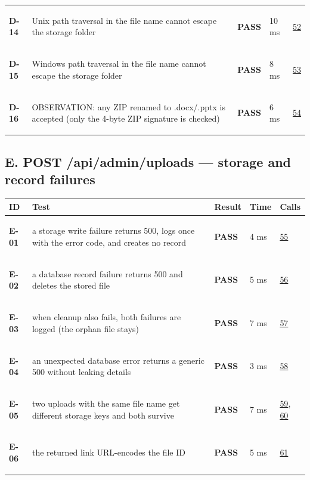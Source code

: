 \documentclass[10pt,a4paper]{article}
\begin{document}
\begin{longtable}{@{}P{1.2cm}P{9.2cm}P{1.2cm}P{1.3cm}P{2.4cm}@{}}
\hypertarget{test-D-14}{\textbf{D-14}} & Unix path traversal in the file name cannot escape the storage folder & \textcolor{passgreen}{\textbf{PASS}} & 10 ms & \hyperlink{call52}{52} \\
\hypertarget{test-D-15}{\textbf{D-15}} & Windows path traversal in the file name cannot escape the storage folder & \textcolor{passgreen}{\textbf{PASS}} & 8 ms & \hyperlink{call53}{53} \\
\hypertarget{test-D-16}{\textbf{D-16}} & OBSERVATION: any ZIP renamed to .docx/.pptx is accepted (only the 4-byte ZIP signature is checked) & \textcolor{passgreen}{\textbf{PASS}} & 6 ms & \hyperlink{call54}{54} \\
\bottomrule
\end{longtable}

\subsection*{E. POST /api/admin/uploads — storage and record failures}
\begin{longtable}{@{}P{1.2cm}P{9.2cm}P{1.2cm}P{1.3cm}P{2.4cm}@{}}
\toprule \textbf{ID} & \textbf{Test} & \textbf{Result} & \textbf{Time} & \textbf{Calls} \\ \midrule \endhead
\hypertarget{test-E-01}{\textbf{E-01}} & a storage write failure returns 500, logs once with the error code, and creates no record & \textcolor{passgreen}{\textbf{PASS}} & 4 ms & \hyperlink{call55}{55} \\
\hypertarget{test-E-02}{\textbf{E-02}} & a database record failure returns 500 and deletes the stored file & \textcolor{passgreen}{\textbf{PASS}} & 5 ms & \hyperlink{call56}{56} \\
\hypertarget{test-E-03}{\textbf{E-03}} & when cleanup also fails, both failures are logged (the orphan file stays) & \textcolor{passgreen}{\textbf{PASS}} & 7 ms & \hyperlink{call57}{57} \\
\hypertarget{test-E-04}{\textbf{E-04}} & an unexpected database error returns a generic 500 without leaking details & \textcolor{passgreen}{\textbf{PASS}} & 3 ms & \hyperlink{call58}{58} \\
\hypertarget{test-E-05}{\textbf{E-05}} & two uploads with the same file name get different storage keys and both survive & \textcolor{passgreen}{\textbf{PASS}} & 7 ms & \hyperlink{call59}{59}, \hyperlink{call60}{60} \\
\hypertarget{test-E-06}{\textbf{E-06}} & the returned link URL-encodes the file ID & \textcolor{passgreen}{\textbf{PASS}} & 5 ms & \hyperlink{call61}{61} \\
\bottomrule
\end{longtable}
\end{document}
